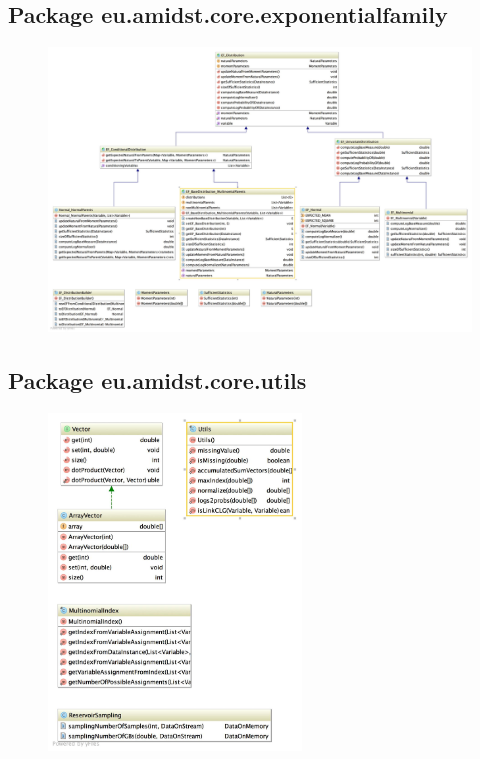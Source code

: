 \subsection{Package eu.amidst.core.exponentialfamily}

\begin{figure}[H]
  \centering
    \includegraphics[width=\textwidth]{ClassDiagrams/core_exponentialfamily.jpg}
\end{figure}

\subsection{Package eu.amidst.core.utils}
\begin{figure}[H]
  \centering
    \includegraphics[width=0.6\textwidth]{ClassDiagrams/core_utils.jpg}
\end{figure}